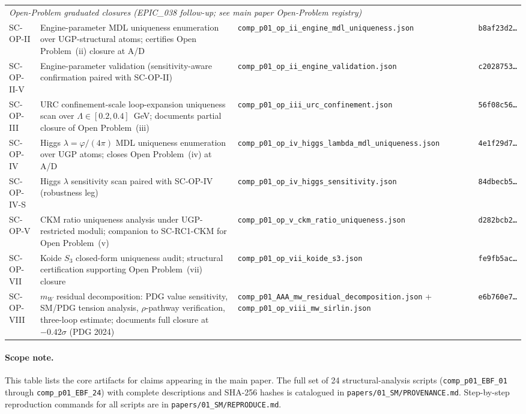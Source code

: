 \documentclass[10pt]{article}
\begin{document}
\begin{longtable}{@{} p{1.4cm} p{5.0cm} p{4.0cm} p{3.4cm} @{}}
\multicolumn{4}{l}{\textit{Open-Problem graduated closures (EPIC\_038 follow-up; see main paper Open-Problem registry)}} \\[2pt]
SC-OP-II & Engine-parameter MDL uniqueness enumeration over UGP-structural atoms; certifies Open Problem~(ii) closure at A/D & \nolinkurl{comp_p01_op_ii_engine_mdl_uniqueness.json} & \texttt{b8af23d2\ldots} \\
SC-OP-II-V & Engine-parameter validation (sensitivity-aware confirmation paired with SC-OP-II) & \nolinkurl{comp_p01_op_ii_engine_validation.json} & \texttt{c2028753\ldots} \\
SC-OP-III & URC confinement-scale loop-expansion uniqueness scan over $\Lambda \in [0.2,0.4]$~GeV; documents partial closure of Open Problem~(iii) & \nolinkurl{comp_p01_op_iii_urc_confinement.json} & \texttt{56f08c56\ldots} \\
SC-OP-IV & Higgs $\lambda = \varphi/(4\pi)$ MDL uniqueness enumeration over UGP atoms; closes Open Problem~(iv) at A/D & \nolinkurl{comp_p01_op_iv_higgs_lambda_mdl_uniqueness.json} & \texttt{4e1f29d7\ldots} \\
SC-OP-IV-S & Higgs $\lambda$ sensitivity scan paired with SC-OP-IV (robustness leg) & \nolinkurl{comp_p01_op_iv_higgs_sensitivity.json} & \texttt{84dbecb5\ldots} \\
SC-OP-V & CKM ratio uniqueness analysis under UGP-restricted moduli; companion to SC-RC1-CKM for Open Problem~(v) & \nolinkurl{comp_p01_op_v_ckm_ratio_uniqueness.json} & \texttt{d282bcb2\ldots} \\
SC-OP-VII & Koide $S_3$ closed-form uniqueness audit; structural certification supporting Open Problem~(vii) closure & \nolinkurl{comp_p01_op_vii_koide_s3.json} & \texttt{fe9fb5ac\ldots} \\
SC-OP-VIII & $m_W$ residual decomposition: PDG value sensitivity, SM/PDG tension analysis, $\rho$-pathway verification, three-loop estimate; documents full closure at $-0.42\sigma$ (PDG 2024) & \nolinkurl{comp_p01_AAA_mw_residual_decomposition.json} + \nolinkurl{comp_p01_op_viii_mw_sirlin.json} & \texttt{e6b760e7\ldots} \\

\end{longtable}

\paragraph{Scope note.}
This table lists the core artifacts for claims appearing in the main paper.  The full set of 24 structural-analysis scripts (\texttt{comp\_p01\_EBF\_01} through \texttt{comp\_p01\_EBF\_24}) with complete descriptions and SHA-256 hashes is catalogued in \texttt{papers/01\_SM/PROVENANCE.md}.  Step-by-step reproduction commands for all scripts are in \texttt{papers/01\_SM/REPRODUCE.md}.
\end{document}
